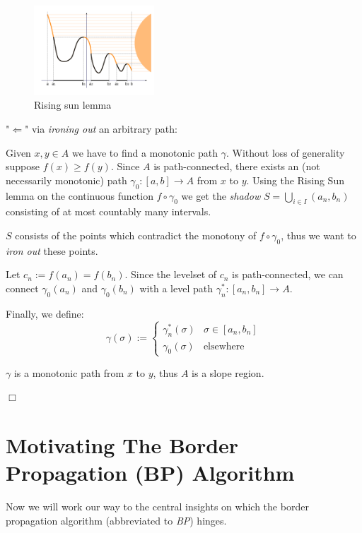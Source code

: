 \documentclass[a4paper,12pt,notitlepage,fullpage]{paper}
\theoremstyle{plain}
\theoremstyle{definition}
\begin{document}
$~$

\begin{figure}
\centering
\includegraphics[width=0.4\textwidth]{img/Rising_sun_lemma.png}
\caption{Rising sun lemma}
\label{fig:lemma_1}
\end{figure}

"$\Leftarrow$" via \emph{ironing out} an arbitrary path:

Given $x, y \in A$ we have to find a monotonic path $\gamma$. Without loss of generality suppose $f(x) \geq f(y)$. Since $A$ is path-connected, there exists an (not necessarily monotonic) path $\gamma_0: [a,b] \to A$ from $x$ to $y$. Using the Rising Sun lemma \cite{grill} on the continuous function $f \circ \gamma_0$ we get the \emph{shadow} $S = \bigcup_{i \in I} (a_n, b_n)$ consisting of at most countably many intervals.

$S$ consists of the points which contradict the monotony of $f \circ \gamma_0$, thus we want to \emph{iron out} these points.

Let $c_n := f(a_n) = f(b_n)$. Since the levelset of $c_n$ is path-connected, we can connect $\gamma_0(a_n)$ and $\gamma_0(b_n)$ with a level path $\gamma_n^* : [a_n, b_n] \to A.$

Finally, we define:
\begin{equation*}
\gamma(\sigma) :=
\begin{cases}
\gamma_n^*(\sigma) & \sigma \in [a_n, b_n] \\
\gamma_0(\sigma) & \text{elsewhere}
\end{cases}
\end{equation*}

$\gamma$ is a monotonic path from $x$ to $y$, thus $A$ is a slope region.

\hfill $\Box$



\section{Motivating The Border Propagation (BP) Algorithm}
Now we will work our way to the central insights on which the border propagation algorithm (abbreviated to \emph{BP}) hinges.
\end{document}
